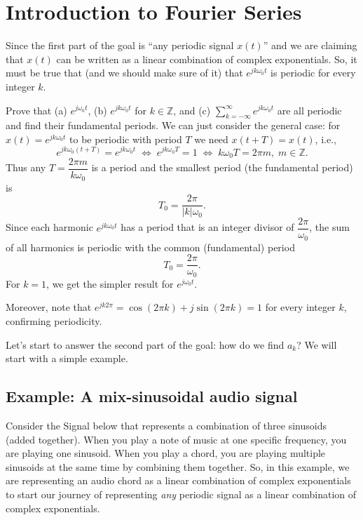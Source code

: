 \documentclass{ee102_notes}
\begin{document}
\section{Introduction to Fourier Series}
Since the first part of the goal is ``any periodic signal $x(t)$'' and we are claiming that $x(t)$ can be written as a linear combination of complex exponentials. So, it must be true that (and we should make sure of it) that $e^{jk\omega_0 t}$ is periodic for every integer $k$.
\begin{popquiz}
Prove that (a) $e^{j\omega_0 t}$, (b) $e^{jk\omega_0 t}$ for $k \in \mathbb{Z}$, and (c) $\displaystyle\sum_{k=-\infty}^{\infty} e^{jk\omega_0 t}$ are all periodic and find their fundamental periods.
\popqsplit
We can just consider the general case: for $x(t) = e^{jk\omega_0 t}$ to be periodic with period $T$ we need
$x(t+T)=x(t)$, i.e.,
\[
e^{jk\omega_0 (t+T)}=e^{jk\omega_0 t}
\;\Longleftrightarrow\;
e^{jk\omega_0 T}=1 
\;\Longleftrightarrow\; k\omega_0 T=2\pi m,\; m\in\mathbb{Z}.
\]
Thus any $T=\dfrac{2\pi m}{k\omega_0}$ is a period and the smallest period (the fundamental period) is
\[
T_0=\frac{2\pi}{|k|\omega_0}.
\]
Since each harmonic $e^{jk\omega_0 t}$ has a period that is an integer divisor of $\dfrac{2\pi}{\omega_0}$, the sum of all harmonics is periodic with the common (fundamental) period
\[
T_0=\frac{2\pi}{\omega_0}.
\]
For $k=1$, we get the simpler result for $e^{j\omega_0 t}$.

Moreover, note that $e^{jk 2\pi}= \cos(2\pi k)+j\sin(2\pi k)=1$ for every integer $k$, confirming periodicity.
\end{popquiz}

Let's start to answer the second part of the goal: how do we find $a_k$? We will start with a simple example.
\subsection{Example: A mix-sinusoidal audio signal}
Consider the Signal below that represents a combination of three sinusoids (added together). When you play a note of music at one specific frequency, you are playing one sinusoid. When you play a chord, you are playing multiple sinusoids at the same time by combining them together. So, in this example, we are representing an audio chord as a linear combination of complex exponentials to start our journey of representing \emph{any} periodic signal as a linear combination of complex exponentials.
\end{document}
